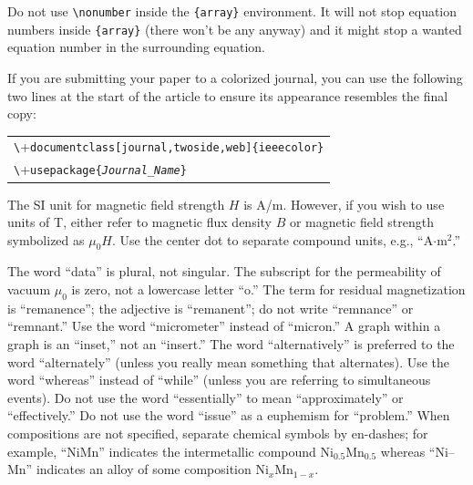 \documentclass[journal,twoside,web]{ieeecolor2}
\begin{document}
Do not use \verb|\nonumber| inside the \verb|{array}| environment.
It
will not stop equation numbers inside \verb|{array}| (there won't be
any anyway) and it might stop a wanted equation number in the
surrounding equation.

If you are submitting your paper to a colorized journal, you can use
the following two lines at the start of the article to ensure its
appearance resembles the final copy:

\smallskip\noindent
\begin{small}
\begin{tabular}{l}
\verb+\+\texttt{documentclass[journal,twoside,web]\{ieeecolor\}}\\
\verb+\+\texttt{usepackage\{\textit{Journal\_Name}\}}
\end{tabular}
\end{small}

The SI unit for magnetic field strength $H$ is A/m.
However, if you wish to use 
units of T, either refer to magnetic flux density $B$ or magnetic field 
strength symbolized as $\mu _{0}H$.
Use the center dot to separate 
compound units, e.g., ``A$\cdot $m$^{2}$.''

The word ``data'' is plural, not singular.
The subscript for the 
permeability of vacuum $\mu _{0}$ is zero, not a lowercase letter 
``o.'' The term for residual magnetization is ``remanence''; the adjective 
is ``remanent''; do not write ``remnance'' or ``remnant.'' Use the word 
``micrometer'' instead of ``micron.'' A graph within a graph is an 
``inset,'' not an ``insert.'' The word ``alternatively'' is preferred to the 
word ``alternately'' (unless you really mean something that alternates).
Use 
the word ``whereas'' instead of ``while'' (unless you are referring to 
simultaneous events).
Do not use the word ``essentially'' to mean 
``approximately'' or ``effectively.'' Do not use the word ``issue'' as a 
euphemism for ``problem.'' When compositions are not specified, separate 
chemical symbols by en-dashes; for example, ``NiMn'' indicates the 
intermetallic compound Ni$_{0.5}$Mn$_{0.5}$ whereas 
``Ni--Mn'' indicates an alloy of some composition 
Ni$_{x}$Mn$_{1-x}$.
\end{document}
